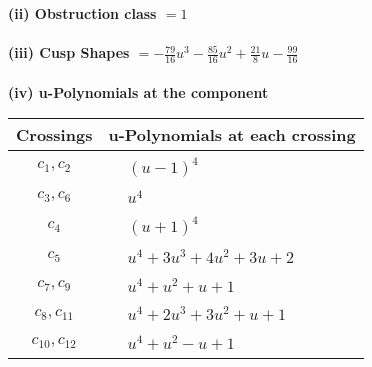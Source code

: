 \documentclass[1p]{elsarticle_modified}
\theoremstyle{definition}
\begin{document}
\flushleft \textbf{(ii) Obstruction class $= 1$}\\~\\
\flushleft \textbf{(iii) Cusp Shapes $= -\frac{79}{16} u^3-\frac{85}{16} u^2+\frac{21}{8} u-\frac{99}{16}$}\\~\\
\newpage\renewcommand{\arraystretch}{1}
\flushleft \textbf{(iv) u-Polynomials at the component}\newline \\
\begin{tabular}{m{50pt}|m{274pt}}
Crossings & \hspace{64pt}u-Polynomials at each crossing \\
\hline $$\begin{aligned}c_{1},c_{2}\end{aligned}$$&$\begin{aligned}
&(u-1)^4
\end{aligned}$\\
\hline $$\begin{aligned}c_{3},c_{6}\end{aligned}$$&$\begin{aligned}
&u^4
\end{aligned}$\\
\hline $$\begin{aligned}c_{4}\end{aligned}$$&$\begin{aligned}
&(u+1)^4
\end{aligned}$\\
\hline $$\begin{aligned}c_{5}\end{aligned}$$&$\begin{aligned}
&u^4+3 u^3+4 u^2+3 u+2
\end{aligned}$\\
\hline $$\begin{aligned}c_{7},c_{9}\end{aligned}$$&$\begin{aligned}
&u^4+u^2+u+1
\end{aligned}$\\
\hline $$\begin{aligned}c_{8},c_{11}\end{aligned}$$&$\begin{aligned}
&u^4+2 u^3+3 u^2+u+1
\end{aligned}$\\
\hline $$\begin{aligned}c_{10},c_{12}\end{aligned}$$&$\begin{aligned}
&u^4+u^2- u+1
\end{aligned}$\\
\hline
\end{tabular}\\~\\
\end{document}
